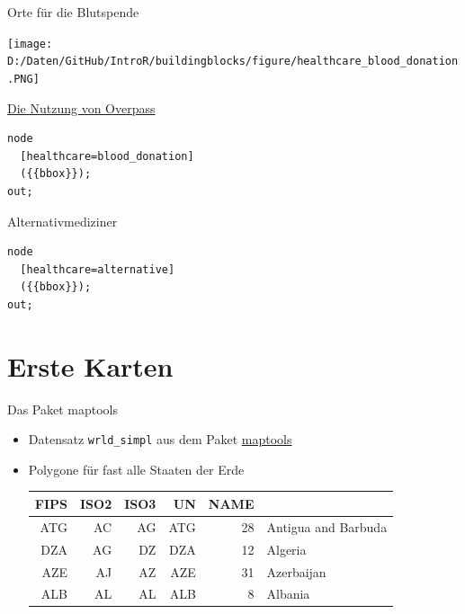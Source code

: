 \documentclass[ignorenonframetext,]{beamer}
\begin{document}
\begin{frame}{Orte für die Blutspende}

\texttt{[image: D:/Daten/GitHub/IntroR/buildingblocks/figure/healthcare\_blood\_donation.PNG]}

\end{frame}

\begin{frame}[fragile]{\href{https://overpass-turbo.eu/}{Die Nutzung von
Overpass}}

\begin{verbatim}
node
  [healthcare=blood_donation]
  ({{bbox}});
out;
\end{verbatim}

\end{frame}

\begin{frame}[fragile]{Alternativmediziner}

\begin{verbatim}
node
  [healthcare=alternative]
  ({{bbox}});
out;
\end{verbatim}

\end{frame}

\section{Erste Karten}\label{erste-karten}

\begin{frame}[fragile]{Das Paket maptools}

\begin{itemize}
\item
  Datensatz \texttt{wrld\_simpl} aus dem Paket
  \href{https://cran.r-project.org/web/packages/maptools/index.html}{maptools}
\item
  Polygone für fast alle Staaten der Erde

  \begin{longtable}[]{@{}rrrrrl@{}}
  \toprule
  FIPS & ISO2 & ISO3 & UN & NAME &\tabularnewline
  \midrule
  \endhead
  ATG & AC & AG & ATG & 28 & Antigua and Barbuda\tabularnewline
  DZA & AG & DZ & DZA & 12 & Algeria\tabularnewline
  AZE & AJ & AZ & AZE & 31 & Azerbaijan\tabularnewline
  ALB & AL & AL & ALB & 8 & Albania\tabularnewline
  \bottomrule
  \end{longtable}
\end{itemize}

\end{frame}
\end{document}
